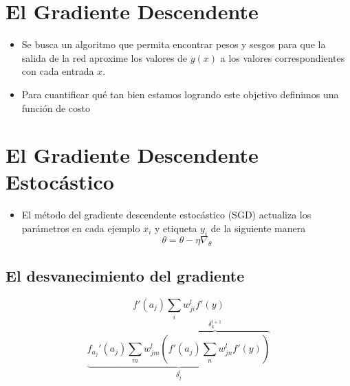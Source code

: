 \section{El Gradiente Descendente}
\begin{frame}{\titulo}{\subtitulo}
    \begin{itemize}
        \item Se busca un algoritmo que permita encontrar pesos y sesgos para que la salida de la red aproxime los valores de $y(x)$ a los valores correspondientes con cada entrada $x$.\bigskip

        \item Para cuantificar qué tan bien estamos logrando este objetivo definimos una función de costo

    \end{itemize}
\end{frame}


\section{El Gradiente Descendente Estocástico}
\begin{frame}{\titulo}{\subtitulo}
    \begin{itemize}
        \item El método del gradiente descendente estocástico (SGD) actualiza los parámetros en cada ejemplo $x_i$ y etiqueta $y_i$ de la siguiente manera $$ \theta = \theta - \eta\nabla_\theta $$
    \end{itemize}
\end{frame}



\begin{frame}{\titulo}{\subtitulo}
    \begin{figure}[H]
        \centering
        \scalebox{0.6}{}
    \end{figure}
\end{frame}

\subsection{El desvanecimiento del gradiente}
\begin{frame}{\titulo}{\subtitulo}
	\begin{figure}[H]
        \centering
        \scalebox{0.50}{}
    \end{figure}
	$$ f'(a_j) \sum_{i} w_{ji}^{l} f'(y) $$
	$$ \underbrace{f_{a_{j}}'(a_j) \sum_{m} w_{jm}^{l} \overbrace{\left(f'(a_j) \sum_{n} w_{jn}^{l} f'(y)\right)}^{\delta_{k}^{l + 1}}}_{\delta_{j}^{l}} $$
\end{frame}
